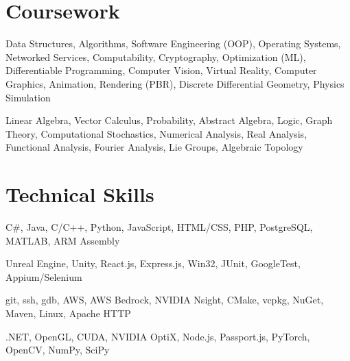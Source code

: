 \documentclass[letterpaper,11pt]{article}
\begin{document}
\section{Coursework}
    \small{\begin{description}[leftmargin=0.5in, itemindent=-0.25in, labelindent=0.5in, itemsep=-0.2em]
        \item[CSE] Data Structures, Algorithms, Software Engineering (OOP), Operating Systems, Networked Services, Computability, Cryptography, Optimization (ML), Differentiable Programming, Computer Vision, Virtual Reality, Computer Graphics, Animation, Rendering (PBR), Discrete Differential Geometry, Physics Simulation \\[1em]

        \item[MATH] Linear Algebra, Vector Calculus, Probability, Abstract Algebra, Logic, Graph Theory, Computational Stochastics, Numerical Analysis, Real Analysis, Functional Analysis, Fourier Analysis, Lie Groups, Algebraic Topology \\[-10em]
    \end{description}}

\section{Technical Skills}
    \small{\begin{description}[leftmargin=0.5in, itemindent=-0.25in, labelindent=0.5in, itemsep=-0.2em]
        \item[Languages] C\#, Java, C/C++, Python, JavaScript, HTML/CSS, PHP, PostgreSQL, MATLAB, ARM Assembly
        \item[Frameworks] Unreal Engine, Unity, React.js, Express.js, Win32, JUnit, GoogleTest, Appium/Selenium
        \item[Developer Tools] git, ssh, gdb, AWS, AWS Bedrock, NVIDIA Nsight, CMake, vcpkg, NuGet, Maven, Linux, Apache HTTP
        \item[Libraries/etc.] .NET, OpenGL, CUDA, NVIDIA OptiX, Node.js, Passport.js, PyTorch, OpenCV, NumPy, SciPy
    \end{description}}

\end{document}
